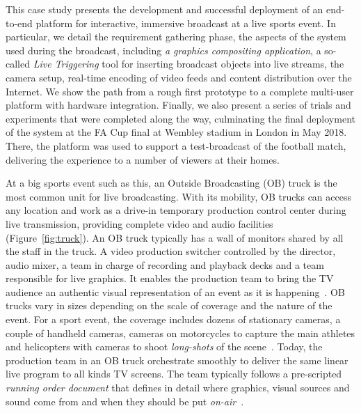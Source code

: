 \documentclass[sigchi-a, authorversion]{acmart}
\begin{document}
 This case study presents the development and successful deployment of an
 end-to-end platform for interactive, immersive broadcast at
 a live sports event. In particular, we detail the requirement gathering phase,
 the aspects of the system used during the broadcast, including \emph{a graphics compositing
 application}, a so-called \emph{Live Triggering} tool for inserting broadcast objects
 into live streams, the camera setup, real-time encoding of video feeds and content
 distribution over the Internet.
 We show the path from a rough first prototype to a complete multi-user platform
 with hardware integration. Finally, we also present a series of trials and
 experiments that were completed along the way, culminating the final
 deployment of the system at the FA Cup final at Wembley stadium in London in
 May 2018. There, the platform was used to support a test-broadcast of the
 football match, delivering the experience to a number of viewers at
 their homes.

At a big sports event such as this, an Outside Broadcasting (OB) truck is the most
common unit for live broadcasting. With its mobility, OB trucks can access any
location and work as a drive-in temporary production control center during live
transmission, providing complete video and audio facilities (Figure~\ref{fig:truck}).
An OB truck typically has a wall of monitors shared by all the staff in the truck.
A video production switcher controlled by the director, audio mixer, a team in
charge of recording and playback decks and a team responsible for live graphics.
It enables the production team to bring the TV audience an authentic
visual representation of an event as it is happening~\cite{owens2015}.
OB trucks vary in sizes depending on the scale of coverage and the nature of the
event. For a sport event, the coverage includes dozens of stationary cameras, a
couple of handheld cameras, cameras on motorcycles to capture the main athletes
and helicopters with cameras to shoot \emph{long-shots} of the
scene~\cite{owens2015, Li:2018_TVX}. Today, the production team in an OB truck
orchestrate smoothly to deliver the same linear live program to all kinds TV
screens. The team typically follows a pre-scripted \emph{running order document} that
defines in detail where graphics, visual sources and sound come from and when
they should be put \emph{on-air}~\cite{Li:2018_TVX}.
\end{document}
